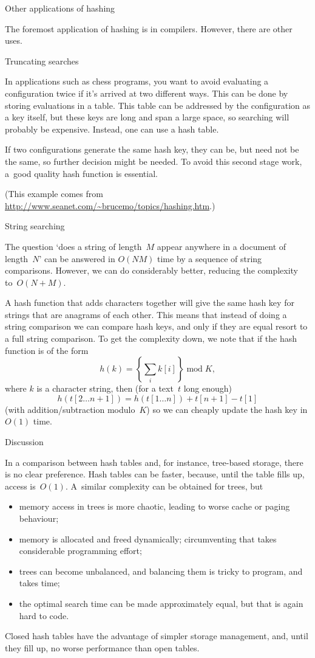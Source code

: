  {Other applications of hashing}

The foremost application of hashing is in compilers. However, there
are other uses.

 {Truncating searches}

In applications such as chess programs, you want to avoid evaluating a
configuration twice if it's arrived at two different ways. This can be
done by storing evaluations in a table. This table can be addressed by
the configuration as a key itself, but these keys are long and span a
large space, so searching will probably be expensive. Instead, one can
use a hash table.

If two
configurations generate the same hash key, they can be, but need not
be the same, so further decision might be needed. To avoid this second
stage work, a~good quality hash function is essential.

(This example comes from
\url{http://www.seanet.com/~brucemo/topics/hashing.htm}.)

 {String searching}

The question `does a string of length~$M$ appear anywhere in a
document of length~$N$' can be answered in $O(NM)$ time by a sequence
of string comparisons. However, we can do considerably better,
reducing the complexity to~$O(N+M)$.

A hash function that adds characters together will give the same hash
key for strings that are anagrams of each other. This means that
instead of doing a string comparison we can compare hash keys, and
only if they are equal resort to a full string comparison. To get the
complexity down, we note that if the hash function is of the form
\[ h(k)=\left\{\sum_ik[i]\right\}\mathop{\mathrm{mod}} K,\]
where $k$ is a character string,
then (for a text~$t$ long enough)
\[ h(t[2\ldots n+1]) = h(t[1\ldots n])+t[n+1]-t[1] \]
(with addition/subtraction modulo~$K$)
so we can cheaply update the hash key in $O(1)$ time.

 {Discussion}

In a comparison between hash tables and, for instance, tree-based
storage, there is no clear preference. Hash tables can be faster,
because, until the table fills up, access is~$O(1)$. A~similar
complexity can be obtained for trees, but
\begin{itemize}
\item memory access in trees is more chaotic, leading to worse cache
  or paging behaviour;
\item memory is allocated and freed dynamically; circumventing that
  takes considerable programming effort;
\item trees can become unbalanced, and balancing them is tricky to
  program, and takes time;
\item the optimal search time can be made approximately equal, but
  that is again hard to code.
\end{itemize}

Closed hash tables have the advantage of simpler storage management,
and, until they fill up, no worse performance than open tables.
